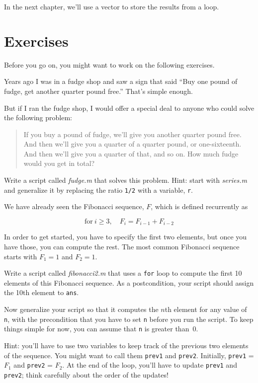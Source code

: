 In the next chapter, we'll use a vector to store the results from a loop.


\section{Exercises}

Before you go on, you might want to work on the following exercises.

\begin{ex}
Years ago I was in a fudge shop and saw a sign that said ``Buy one pound of fudge, get another quarter pound free.''  That's simple enough.

But if I ran the fudge shop, I would offer a special deal to anyone who could solve the following problem:

\begin{quote}
If you buy a pound of fudge, we'll give you another quarter pound free.  And then we'll give you a quarter of a quarter pound, or one-sixteenth.  And then we'll give you a quarter of that, and so on.  How much fudge would you get in total?
\end{quote}

Write a script called \emph{fudge.m} that solves this problem.  Hint: start with \emph{series.m} and generalize it by replacing the ratio \lstinline{1/2} with a variable, \lstinline{r}.

\end{ex}




\begin{ex}
\label{fib2}

We have already seen the Fibonacci sequence, $F$, which
is defined recurrently as

\[ \mathrm{for}~i \ge 3, \quad  F_{i} = F_{i-1} + F_{i-2} \]

In order to get started, you have to specify the first two
elements, but once you have those, you can compute the rest.
The most common Fibonacci sequence starts with $F_1 = 1$ and $F_2 = 1$.

Write a script called \emph{fibonacci2.m} that uses a \lstinline{for} loop
to compute the first 10 elements of this Fibonacci sequence.
As a postcondition, your script should assign the 10th element to
\lstinline{ans}.

Now generalize your script so that it computes the $n$th element
for any value of \lstinline{n}, with the precondition that you have to
set \lstinline{n} before you run the script.  To keep things simple for
now, you can assume that \lstinline{n} is greater than~0.

Hint: you'll have to use two variables to keep track of the
previous two elements of the sequence.  You might want to call
them \lstinline{prev1} and \lstinline{prev2}.  Initially, \lstinline{prev1} = $F_1$
and \lstinline{prev2} = $F_2$.  At the end of the loop, you'll have
to update \lstinline{prev1} and \lstinline{prev2}; think carefully about the
order of the updates!

\end{ex}
